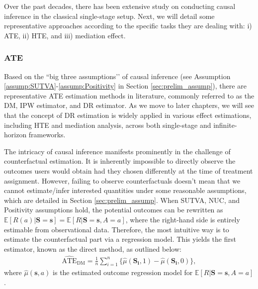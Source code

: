 Over the past decades, there has been extensive study on conducting causal inference in the classical single-stage setup. Next, we will detail some representative approaches according to the specific tasks they are dealing with: i) \acrshort{ATE}, ii) \acrshort{HTE}, and iii) mediation effect.

\subsubsection{\acrshort{ATE}}

Based on the ``big three assumptions’’ of causal inference (see Assumption \ref{assump:SUTVA}-\ref{assump:Positivity} in Section \ref{sec:prelim_assump}), there are representative \acrshort{ATE} estimation methods in literature, commonly referred to as the \acrfull{DM}, \acrfull{IPW} estimator, and \acrfull{DR} estimator. As we move to later chapters, we will see that the concept of DR estimation is widely applied in various effect estimations, including \acrshort{HTE} and mediation analysis, across both single-stage and infinite-horizon frameworks.

The intricacy of causal inference manifests prominently in the challenge of counterfactual estimation. It is inherently impossible to directly observe the outcomes users would obtain had they chosen differently at the time of treatment assignment. However, failing to observe counterfactuals doesn’t mean that we cannot estimate/infer interested quantities under some reasonable assumptions, which are detailed in Section \ref{sec:prelim_assump}. When \acrshort{SUTVA}, \acrshort{NUC}, and Positivity assumptions hold, the potential outcomes can be rewritten as $\mathbb{E}[R(a)|\boldsymbol{S}=\boldsymbol{s}] = \mathbb{E}[R|\boldsymbol{S}=\boldsymbol{s}, A=a]$, where the right-hand side is entirely estimable from observational data. Therefore, the most intuitive way is to estimate the counterfactual part via a regression model. This yields the first estimator, known as the direct method, as outlined below:
\begin{equation} \label{eq:CEL_p1_DM}
\begin{aligned} \widehat{\text{ATE}}_{\text{DM}} = \frac{1}{n}\sum_{i=1}^n \{\hat{\mu}(\boldsymbol{S_i}, 1) - \hat{\mu}(\boldsymbol{S_i}, 0)\} ,
\end{aligned}
\end{equation}
where $\hat{\mu}(\boldsymbol{s},a)$ is the estimated outcome regression model for $\mathbb{E}[R|\boldsymbol{S}=\boldsymbol{s}, A=a]$.

